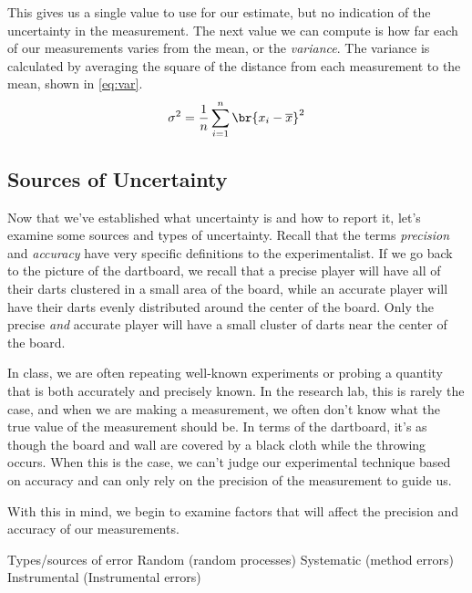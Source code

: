 \documentclass[nobib,nofonts,nols,nohyper]{tufte-handout}
\begin{document}
This gives us a single value to use for our estimate, but no indication of the uncertainty in the measurement. 
The next value we can compute is how far each of our measurements varies from the mean, or the \emph{variance}. 
The variance is calculated by averaging the square of the distance from each measurement to the mean, shown in \cref{eq:var}. 
\begin{equation}
	\sigma^2 = \frac{1}{n}\sum_{i=1}^{n}{\br{x_i - \overline{x}}^2}
	\label{eq:var}
\end{equation}




\subsection{Sources of Uncertainty} %
\label{sub:sources_of_uncertainty}

Now that we've established what uncertainty is and how to report it, let's examine some sources and types of uncertainty. 
Recall that the terms \emph{precision} and \emph{accuracy} have very specific definitions to the experimentalist. 
If we go back to the picture of the dartboard, we recall that a precise player will have all of their darts clustered in a small area of the board, while an accurate player will have their darts evenly distributed around the center of the board. 
Only the precise \emph{and} accurate player will have a small cluster of darts near the center of the board. 

In class, we are often repeating well-known experiments or probing a quantity that is both accurately and precisely known. 
In the research lab, this is rarely the case, and when we are making a measurement, we often don't know what the true value of the measurement should be. 
In terms of the dartboard, it's as though the board and wall are covered by a black cloth while the throwing occurs. 
When this is the case, we can't judge our experimental technique based on accuracy and can only rely on the precision of the measurement to guide us. 

With this in mind, we begin to examine factors that will affect the precision and accuracy of our measurements. 



Types/sources of error
Random (random processes)
Systematic (method errors)
Instrumental (Instrumental errors)
\end{document}
